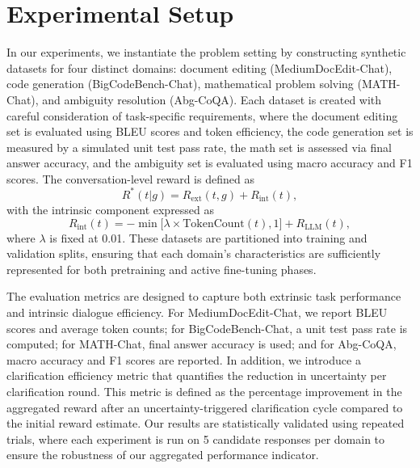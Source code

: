 \documentclass{article} %
\begin{document}
\section{Experimental Setup}
In our experiments, we instantiate the problem setting by constructing synthetic datasets for four distinct domains: document editing (MediumDocEdit-Chat), code generation (BigCodeBench-Chat), mathematical problem solving (MATH-Chat), and ambiguity resolution (Abg-CoQA). Each dataset is created with careful consideration of task-specific requirements, where the document editing set is evaluated using BLEU scores and token efficiency, the code generation set is measured by a simulated unit test pass rate, the math set is assessed via final answer accuracy, and the ambiguity set is evaluated using macro accuracy and F1 scores. The conversation-level reward is defined as 
\[
R^*(t|g) = R_{\text{ext}}(t,g) + R_{\text{int}}(t),
\]
with the intrinsic component expressed as 
\[
R_{\text{int}}(t) = -\min\bigl[\lambda \times \text{TokenCount}(t), 1\bigr] + R_{\text{LLM}}(t),
\]
where \(\lambda\) is fixed at 0.01. These datasets are partitioned into training and validation splits, ensuring that each domain's characteristics are sufficiently represented for both pretraining and active fine-tuning phases.

The evaluation metrics are designed to capture both extrinsic task performance and intrinsic dialogue efficiency. For MediumDocEdit-Chat, we report BLEU scores and average token counts; for BigCodeBench-Chat, a unit test pass rate is computed; for MATH-Chat, final answer accuracy is used; and for Abg-CoQA, macro accuracy and F1 scores are reported. In addition, we introduce a clarification efficiency metric that quantifies the reduction in uncertainty per clarification round. This metric is defined as the percentage improvement in the aggregated reward after an uncertainty-triggered clarification cycle compared to the initial reward estimate. Our results are statistically validated using repeated trials, where each experiment is run on 5 candidate responses per domain to ensure the robustness of our aggregated performance indicator.
\end{document}
